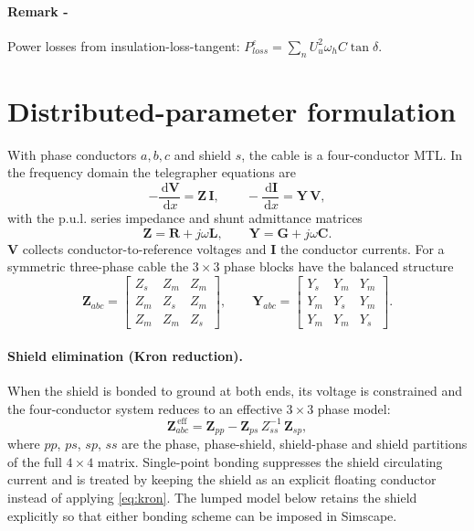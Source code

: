 \documentclass[11pt,a4paper,oneside]{book}
\newcommand{\ud}{\,\mathrm{d}}
\newcommand{\Zmat}{\bm{Z}}
\newcommand{\Ymat}{\bm{Y}}
\newcommand{\Rmat}{\bm{R}}
\newcommand{\Lmat}{\bm{L}}
\newcommand{\Cmat}{\bm{C}}
\newcommand{\Gmat}{\bm{G}}
\newcommand{\Vvec}{\bm{V}}
\newcommand{\Ivec}{\bm{I}}
\begin{document}
\begin{onehalfspace}
\begin{appendices}
\paragraph{Remark -} Power losses from insulation-loss-tangent: {$P_{loss}^\varepsilon = \sum_{n} U_u^2 \omega_h C \tan \delta$}.
\section{Distributed-parameter formulation}
With phase conductors $a,b,c$ and shield $s$, the cable is a four-conductor MTL.
In the frequency domain the telegrapher equations are
\begin{equation}
	-\frac{\ud \Vvec}{\ud x}=\Zmat\,\Ivec,
	\qquad
	-\frac{\ud \Ivec}{\ud x}=\Ymat\,\Vvec,
	\label{eq:telegraph}
\end{equation}
with the p.u.l. series impedance and shunt admittance matrices
\begin{equation}
	\Zmat=\Rmat+j\omega\Lmat,
	\qquad
	\Ymat=\Gmat+j\omega\Cmat .
	\label{eq:ZY}
\end{equation}
$\Vvec$ collects conductor-to-reference voltages and $\Ivec$ the conductor
currents. For a symmetric three-phase cable the $3\times3$ phase blocks have the
balanced structure
\begin{equation}
	\Zmat_{abc}=
	\begin{bmatrix}
		Z_s & Z_m & Z_m\\
		Z_m & Z_s & Z_m\\
		Z_m & Z_m & Z_s
	\end{bmatrix},
	\qquad
	\Ymat_{abc}=
	\begin{bmatrix}
		Y_s & Y_m & Y_m\\
		Y_m & Y_s & Y_m\\
		Y_m & Y_m & Y_s
	\end{bmatrix}.
	\label{eq:balanced}
\end{equation}

\paragraph{Shield elimination (Kron reduction).}
When the shield is bonded to ground at both ends, its voltage is constrained and
the four-conductor system reduces to an effective $3\times3$ phase model:
\begin{equation}
	\Zmat_{abc}^{\,\mathrm{eff}}
	=\Zmat_{pp}-\Zmat_{ps}\,Z_{ss}^{-1}\,\Zmat_{sp},
	\label{eq:kron}
\end{equation}
where $pp$, $ps$, $sp$, $ss$ are the phase, phase-shield, shield-phase and shield
partitions of the full $4\times4$ matrix. Single-point bonding suppresses the
shield circulating current and is treated by keeping the shield as an explicit
floating conductor instead of applying \eqref{eq:kron}. The lumped model below
retains the shield explicitly so that either bonding scheme can be imposed in
Simscape.


\end{appendices}
\end{onehalfspace}
\end{document}
